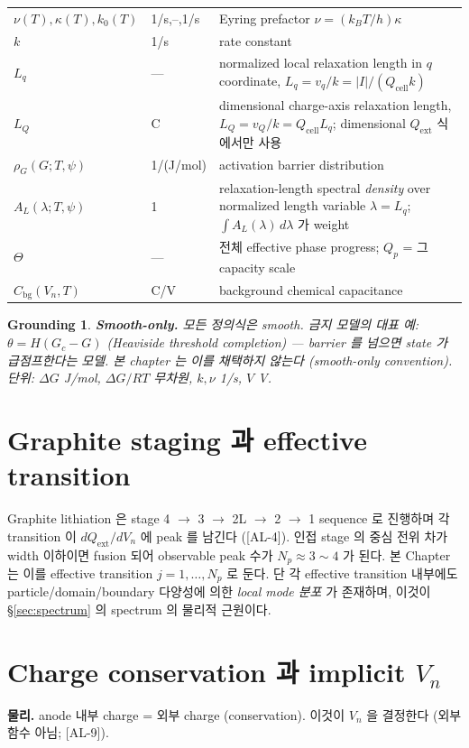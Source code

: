 \documentclass[11pt,a4paper]{article}
\newtheorem*{groundingbox}{Grounding}
\newcommand{\bg}{\mathrm{bg}}
\newcommand{\cell}{\mathrm{cell}}
\newcommand{\ext}{\mathrm{ext}}
\newcommand{\AL}[1]{\textsf{[AL-#1]}}
\begin{document}
\begin{longtable}{p{} p{} p{}}
$\nu(T),\kappa(T),k_0(T)$ & 1/s,--,1/s & Eyring prefactor $\nu=(k_BT/h)\kappa$ \\
$k$ & 1/s & rate constant \\
$L_q$ & --- & normalized local relaxation length in $q$ coordinate, $L_q=v_q/k=|I|/(Q_\cell k)$ \\
$L_Q$ & C & dimensional charge-axis relaxation length, $L_Q=v_Q/k=Q_\cell L_q$; dimensional $Q_\ext$ 식에서만 사용 \\
$\rho_G(G;T,\psi)$ & 1/(J/mol) & activation barrier distribution \\
$A_L(\lambda;T,\psi)$ & 1 & relaxation-length spectral \emph{density} over normalized length variable $\lambda=L_q$; $\int A_L(\lambda)\,d\lambda$ 가 weight \\
$\Theta$ & --- & 전체 effective phase progress; $Q_p$ = 그 capacity scale \\
$C_\bg(V_n,T)$ & C/V & background chemical capacitance \\
\bottomrule
\end{longtable}
\begin{groundingbox}
\textbf{Smooth-only.} 모든 정의식은 smooth. 금지 모델의 대표 예: $\theta=H(G_c-G)$
(Heaviside threshold completion) — barrier 를 넘으면 state 가 급점프한다는 모델. 본 chapter
는 이를 채택하지 않는다 (smooth-only convention). 단위: $\Delta G$ J/mol, $\Delta G/RT$
무차원, $k,\nu$ 1/s, $V$ V.
\end{groundingbox}

\section{Graphite staging 과 effective transition}\label{sec:staging}
Graphite lithiation 은 stage 4 $\to$ 3 $\to$ 2L $\to$ 2 $\to$ 1 sequence 로 진행하며 각
transition 이 $dQ_\ext/dV_n$ 에 peak 를 남긴다 \cite{dahn1991,ohzuku1993,funabiki1999} (\AL{4}).
인접 stage 의 중심 전위 차가 width 이하이면 fusion 되어 observable peak 수가 $N_p\approx
3\sim4$ 가 된다. 본 Chapter 는 이를 effective transition $j=1,\dots,N_p$ 로 둔다. 단 각
effective transition 내부에도 particle/domain/boundary 다양성에 의한 \emph{local mode 분포}
가 존재하며, 이것이 \S\ref{sec:spectrum} 의 spectrum 의 물리적 근원이다.

\section{Charge conservation 과 implicit $V_n$}\label{sec:charge}
\textbf{물리.} anode 내부 charge = 외부 charge (conservation). 이것이 $V_n$ 을 결정한다
(외부 함수 아님; \AL{9}).
\end{document}
